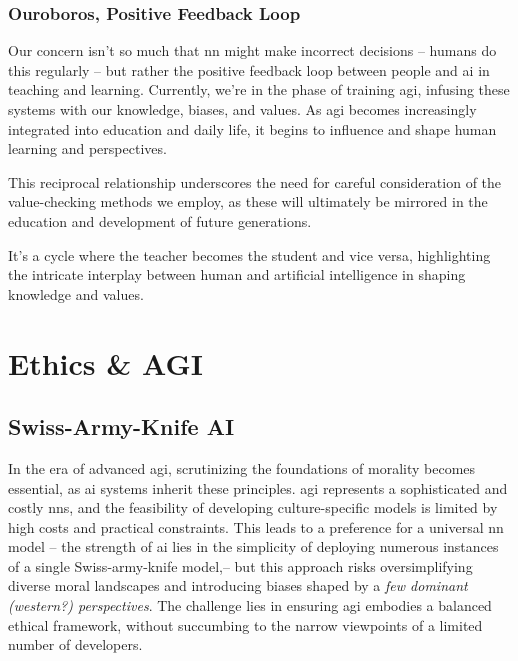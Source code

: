 \documentclass[11pt,a4]{article}
\begin{document}
    \subsubsection{Ouroboros, Positive Feedback Loop}
    \par
    Our concern isn't so much that \acrshort{nn} might make incorrect decisions --
    humans do this regularly – but rather the positive feedback loop
    between people and \acrshort{ai} in teaching and learning. Currently,
    we're in the phase of training \acrshort{agi}, infusing these
    systems with our knowledge, biases, and values.
    As \acrshort{agi} becomes increasingly integrated into
    education and daily life, it begins to influence and shape
    human learning and perspectives.
    \par
    This reciprocal relationship underscores the need for
    careful consideration of the value-checking methods
    we employ, as these will ultimately be mirrored in
    the education and development of future generations.
    \par
    It's a cycle where the teacher becomes the student and vice versa,
    highlighting the intricate interplay between human and artificial
    intelligence in shaping knowledge and values.











\newpage
\section{Ethics \& AGI}

\subsection{Swiss-Army-Knife AI}

In the era of advanced \acrshort{agi}, scrutinizing the foundations of
morality becomes essential, as \acrshort{ai} systems inherit
these principles.
\acrshort{agi} represents a sophisticated and costly \glspl{nn}, and
the feasibility of developing culture-specific models is
limited by high costs and practical constraints. This leads
to a preference for a universal \acrshort{nn} model -- the
strength of \acrshort{ai} lies in the simplicity of deploying numerous instances of a single Swiss-army-knife  model,--  but this approach
risks oversimplifying diverse moral landscapes and
introducing biases shaped by a \textit{few dominant
(western?) perspectives}. The challenge lies in
ensuring \acrshort{agi} embodies a balanced ethical framework,
without succumbing to the narrow viewpoints of a limited number of developers.
\end{document}
